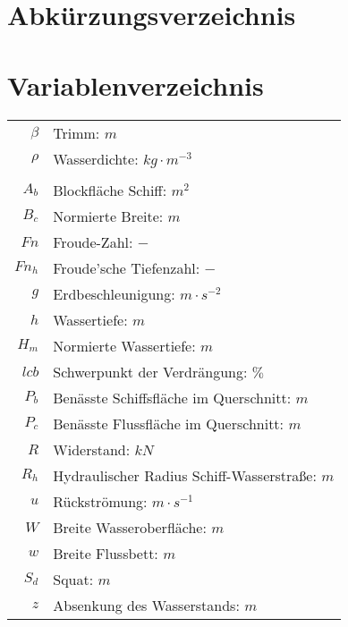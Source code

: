 \newpage
\chapter*{Abkürzungsverzeichnis}
\begin{acronym}
\end{acronym}

\newpage
\chapter*{Variablenverzeichnis}
\begin{table}[ht]
	\begin{tabular}{rl}
	
	\(\beta\) & Trimm: \(m\)\\		
	\(\rho\)& Wasserdichte: \(kg\cdot m^{-3}\)	\\		
	&	\\
	\(A_b\)& Blockfläche Schiff: \(m^2\)\\
	\(B_c\)& Normierte Breite: \(m\)\\
	\(Fn\) & Froude-Zahl: \(-\)\\
	\(Fn_h\) & Froude'sche Tiefenzahl: \(-\)\\	
	\(g\) & Erdbeschleunigung: \(m \cdot s^{-2}\)\\
	\(h\)& Wassertiefe: \(m\)\\
	\(H_m\)& Normierte Wassertiefe: \(m\)\\
	\(lcb\) & Schwerpunkt der Verdrängung: \(\%\)\\
	\(P_b\)& Benässte Schiffsfläche im Querschnitt: \(m\)\\
	\(P_c\)& Benässte Flussfläche im Querschnitt: \(m\)\\
	\(R\) & Widerstand: \(kN\)\\
	\(R_h\)& Hydraulischer Radius Schiff-Wasserstraße: \(m\)\\		
	
	\(u\) & Rückströmung: \(m\cdot s^{-1}\)\\
	\(W\)& Breite Wasseroberfläche: \(m\)\\
	\(w\)& Breite Flussbett: \(m\)\\
	\(S_d\) & Squat: \(m\)\\	
 	\(z\) & Absenkung des Wasserstands: \(m\)\\
\end{tabular}
\end{table}